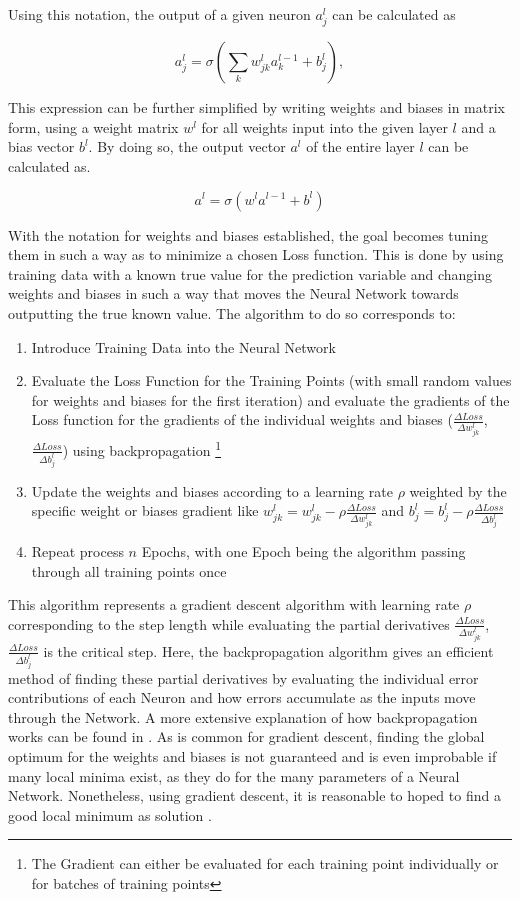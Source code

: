  Using this notation, the output of a given neuron $a_j^l$ can be calculated as 
 
 $$
 a_j^l = \sigma\left( \sum_k w_{jk}^l a_k^{l-1} + b_j^l \right),
 $$
 
 This expression can be further simplified by writing weights and biases in matrix form, using a weight matrix $w^l$ for all weights input into the given layer $l$ and a bias vector $b^l$. By doing so, the output vector $a^l$ of the entire layer $l$ can be calculated as.
 
 $$a^l = \sigma (w^la^{l-1}+b^l)$$
 
With the notation for weights and biases established, the goal becomes tuning them in such a way as to minimize a chosen Loss function. This is done by using training data with a known true value for the prediction variable and changing weights and biases in such a way that moves the Neural Network towards outputting the true known value. 
The algorithm to do so corresponds to: 

\begin{enumerate}
	\item Introduce Training Data into the Neural Network
	\item Evaluate the Loss Function for the Training Points (with small random values for weights and biases for the first iteration) and evaluate the gradients of the Loss function for the gradients of the individual weights and biases ($\frac{\Delta Loss}{\Delta w_{jk}^l}$, $\frac{\Delta Loss}{\Delta b_j^l}$) using backpropagation  \footnote{The Gradient can either be evaluated for each training point individually or for batches of training points}
	\item Update the weights and biases according to a learning rate $\rho$ weighted by the specific weight or biases gradient like $w_{jk}^l =w_{jk}^l - \rho \frac{\Delta Loss}{\Delta w_{jk}^l}$ and $b_j^l =b_j^l - \rho \frac{\Delta Loss}{\Delta b_j^l}$ 
	\item Repeat process $n$ Epochs, with one Epoch being the algorithm passing through all training points once
\end{enumerate}

This algorithm represents a gradient descent algorithm with learning rate  $\rho$ corresponding to the step length while evaluating the partial derivatives $\frac{\Delta Loss}{\Delta w_{jk}^l}$, $\frac{\Delta Loss}{\Delta b_j^l}$ is the critical step. Here, the backpropagation algorithm gives an efficient method of finding these partial derivatives by evaluating the individual error contributions of each Neuron and how errors accumulate as the inputs move through the Network. A more extensive explanation of how backpropagation works can be found in \cite{nielsen2015neuralChap2}. As is common for gradient descent, finding the global optimum for the weights and biases is not guaranteed and is even improbable if many local minima exist, as they do for the many parameters of a Neural Network. Nonetheless, using gradient descent, it is reasonable to hoped to find a good local minimum as solution \cite{James2023,nielsen2015neuralChap2}.


